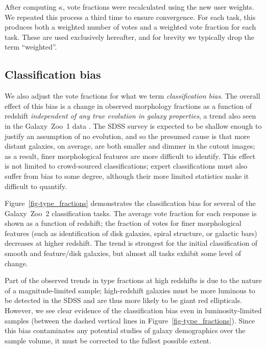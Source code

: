 \documentclass[useAMS,usenatbib]{mn2e}
\begin{document}
After computing $\kappa$, vote fractions were recalculated using the new user weights. We repeated this process a third time to ensure convergence.
 For each task, this produces both a weighted number of votes and a weighted vote fraction for each task. These are used exclusively hereafter, and for brevity we typically drop the term ``weighted''. 

\subsection{Classification bias}\label{ssec-classificationbias}

We also adjust the vote fractions for what we term {\it classification bias}. The overall effect of this bias is a change in observed morphology fractions as a function of redshift {\em independent of any true evolution in galaxy properties}, a trend also seen in the Galaxy~Zoo~1 data \citep{bam09}. The SDSS survey is expected to be shallow enough to justify an assumption of no evolution, and so the presumed cause is that more distant galaxies, on average, are both smaller and dimmer in the cutout images; as a result, finer morphological features are more difficult to identify. This effect is not limited to crowd-sourced classifications; expert classifications must also suffer from bias to some degree, although their more limited statistics make it difficult to quantify. 

Figure~\ref{fig-type_fractions} demonstrates the classification bias for several of the Galaxy~Zoo~2 classification tasks. The average vote fraction for each response is shown as a function of redshift; the fraction of votes for finer morphological features (such as identification of disk galaxies, spiral structure, or galactic bars) decreases at higher redshift. The trend is strongest for the initial classification of smooth and feature/disk galaxies, but almost all tasks exhibit some level of change. 

Part of the observed trends in type fractions at high redshifts is due to the nature of a magnitude-limited sample; high-redshift galaxies must be more luminous to be detected in the SDSS and are thus more likely to be giant red ellipticals. However, we see clear evidence of the classification bias even in luminosity-limited samples (between the dashed vertical lines in Figure~\ref{fig-type_fractions}). Since this bias contaminates any potential studies of galaxy demographics over the sample volume, it must be corrected to the fullest possible extent. 
\end{document}
